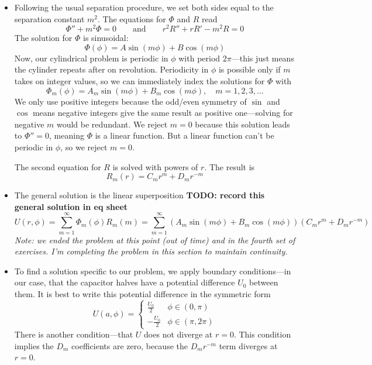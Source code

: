 \documentclass[11pt, a4paper]{article}
\newcommand{\eqtext}[1]{\qquad \text{#1} \qquad}
\begin{document}
\begin{itemize}
	\item Following the usual separation procedure, we set both sides equal to the separation constant $ m^{2} $. The equations for $ \Phi $ and $ R $ read
	\begin{equation*}
		\Phi'' + m^{2} \Phi = 0 \eqtext{and} r^{2}R'' + rR' - m^{2}R = 0
	\end{equation*}
	The solution for $ \Phi $ is sinusoidal:
	\begin{equation*}
		\Phi(\phi) = A \sin(m\phi) + B\cos(m\phi)
	\end{equation*}
	Now, our cylindrical problem is periodic in $ \phi $ with period $ 2\pi $---this just means the cylinder repeats after on revolution. Periodicity in $ \phi $ is possible only if $ m $ takes on integer values, so we can immediately index the solutions for $ \Phi $ with
	\begin{equation*}
		\Phi_{m}(\phi) = A_{m} \sin(m\phi) + B_{m}\cos(m\phi), \quad m = 1, 2, 3, \ldots 
	\end{equation*}
	We only use positive integers because the odd/even symmetry of $ \sin $ and $ \cos $ means negative integers give the same result as positive one---solving for negative $ m $ would be redundant. We reject $ m = 0 $ because this solution leads to $ \Phi'' = 0 $, meaning $ \Phi $ is a linear function. But a linear function can't be periodic in $ \phi $, so we reject $ m = 0 $.
	
	The second equation for $ R $ is solved with powers of $ r $. The result is
	\begin{equation*}
		R_{m}(r) = C_{m}r^{m} + D_{m}r^{-m}
	\end{equation*}
	
	\item The general solution is the linear superposition \textbf{TODO: record this general solution in eq sheet}
	\begin{equation*}
		U(r, \phi) = \sum_{m = 1}^{\infty}\Phi_{m}(\phi)R_{m}(m) = \sum_{m = 1}^{\infty} \left(A_{m} \sin(m\phi) + B_{m}\cos(m\phi)\right)\left( C_{m}r^{m} + D_{m}r^{-m} \right)
	\end{equation*}
	\textit{Note: we ended the problem at this point (out of time) and  in the fourth set of exercises. I'm completing the problem in this section to maintain continuity.}
	
	\item To find a solution specific to our problem, we apply boundary conditions---in our case, that the capacitor halves have a potential difference $ U_{0} $ between them. It is best to write this potential difference in the symmetric form
	\begin{equation*}
		U(a, \phi) = 
		\begin{cases}
			\frac{U_{0}}{2} & \phi \in (0, \pi)\\
			-\frac{U_{0}}{2} & \phi \in (\pi, 2\pi)
		\end{cases}
	\end{equation*}
	There is another condition---that $ U $ does not diverge at $ r = 0 $. This condition implies the $ D_{m} $ coefficients are zero, because the $ D_{m}r^{-m} $ term diverges at $ r = 0 $. 
	

\end{itemize}
\end{document}
